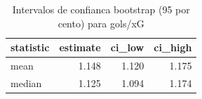 \begin{table}

\caption{\label{tab:ic_bootstrap_g20}Intervalos de confianca bootstrap (95 por cento) para gols/xG}
\centering
\begin{tabular}[t]{lrrr}
\toprule
statistic & estimate & ci\_low & ci\_high\\
\midrule
mean & 1.148 & 1.120 & 1.175\\
median & 1.125 & 1.094 & 1.174\\
\bottomrule
\end{tabular}
\end{table}
